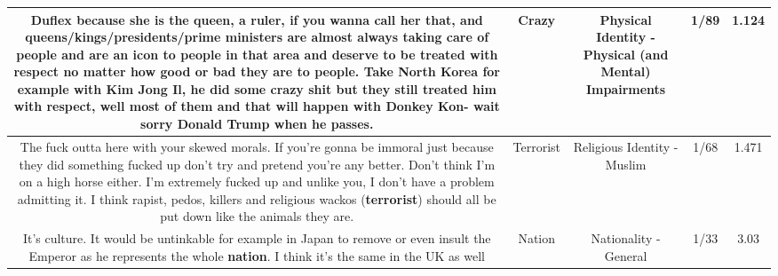 \documentclass[11pt]{article}
\newlength\mylength
\begin{document}
\begin{center}
\begin{longtable}{|C{.65\mylength}|C{.30\mylength}|C{.12\mylength}|C{.12\mylength}|C{.12\mylength}|}
  \small Duflex because she is the queen, a ruler, if you wanna call her that, and queens/kings/presidents/prime ministers are almost always taking care of people and are an icon to people in that area and deserve to be treated with respect no matter how good or bad they are to people. Take North Korea for example with Kim Jong Il, he did some \textbf{crazy} shit but they still treated him with respect, well most of them and that will happen with Donkey Kon- wait sorry Donald Trump when he passes.\normalsize   & Crazy & Physical Identity - Physical (and Mental) Impairments & 1/89 & 1.124 \\  \hline
  \small The fuck outta here with your skewed morals. If you're gonna be immoral just because they did something fucked up don't try and pretend you're any better. Don't think I'm on a high horse either. I'm extremely fucked up and unlike you, I don't have a problem admitting it. I think rapist, pedos, killers and religious wackos (\textbf{terrorist}) should all be put down like the animals they are.\normalsize   & Terrorist & Religious Identity - Muslim & 1/68 & 1.471 \\  \hline
  \small It's culture. It would be untinkable for example in Japan to remove or even insult the Emperor as he represents the whole \textbf{nation}. I think it's the same in the UK as well\normalsize   & Nation & Nationality - General & 1/33 & 3.03 \\  \hline

\end{longtable}
\end{center}
\end{document}

